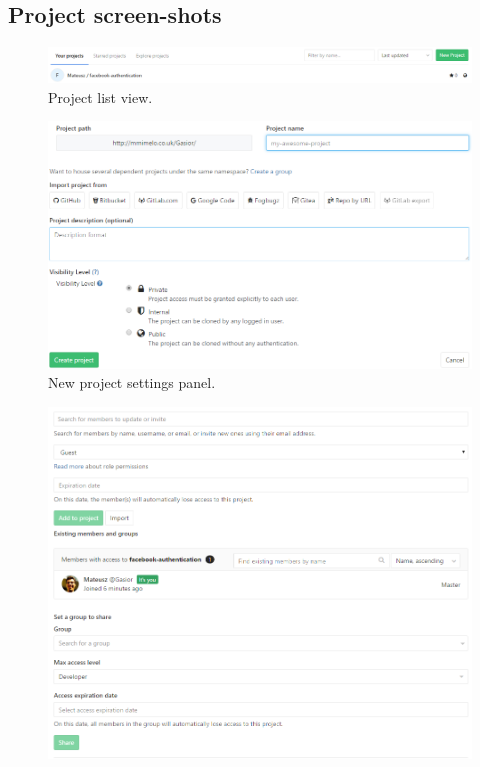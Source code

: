 \begin{appendix}
	\chapter{Project screen-shots}
		\begin{figure}[!htbp]
			\centering
			\includegraphics[width=1\textwidth]{img/ug-project/new-project2}
			\caption{Project list view.}
			\label{fig:project-list-view}
		\end{figure}		
		\begin{figure}[!htbp]
			\centering
			\includegraphics[width=1\textwidth]{img/ug-project/new-project-settings}
			\caption{New project settings panel.}
			\label{fig:project-settings}
		\end{figure}
		\begin{figure}[!htbp]
			\centering
			\includegraphics[width=1\textwidth]{img/ug-project/project-members-permissions}

\end{figure}
\end{appendix}
